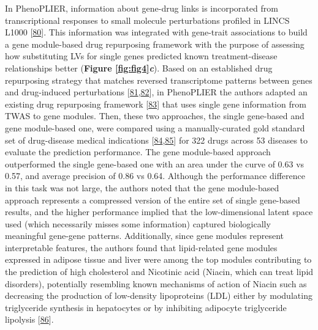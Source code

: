 In PhenoPLIER, information about gene-drug links is incorporated from transcriptional responses to small molecule perturbations profiled in LINCS L1000 {[}\protect\hyperlink{ref-F7lIlh2N}{80}{]}.
This information was integrated with gene-trait associations to build a gene module-based drug repurposing framework with the purpose of assessing how substituting LVs for single genes predicted known treatment-disease relationships better (\textbf{Figure \ref{fig:fig4}\emph{c}}).
Based on an established drug repurposing strategy that matches reversed transcriptome patterns between genes and drug-induced perturbations {[}\protect\hyperlink{ref-1ClBKizD7}{81},\protect\hyperlink{ref-mZjkE1xU}{82}{]}, in PhenoPLIER the authors adapted an existing drug repurposing framework {[}\protect\hyperlink{ref-17oeJ0CXy}{83}{]} that uses single gene information from TWAS to gene modules.
Then, these two approaches, the single gene-based and gene module-based one, were compared using a manually-curated gold standard set of drug-disease medical indications {[}\protect\hyperlink{ref-O21tn8vf}{84},\protect\hyperlink{ref-10KA5jTBQ}{85}{]} for 322 drugs across 53 diseases to evaluate the prediction performance.
The gene module-based approach outperformed the single gene-based one with an area under the curve of 0.63 vs 0.57, and average precision of 0.86 vs 0.64.
Although the performance difference in this task was not large, the authors noted that the gene module-based approach represents a compressed version of the entire set of single gene-based results, and the higher performance implied that the low-dimensional latent space used (which necessarily misses some information) captured biologically meaningful gene-gene patterns.
Additionally, since gene modules represent interpretable features, the authors found that lipid-related gene modules expressed in adipose tissue and liver were among the top modules contributing to the prediction of high cholesterol and Nicotinic acid (Niacin, which can treat lipid disorders), potentially resembling known mechanisms of action of Niacin such as decreasing the production of low-density lipoproteins (LDL) either by modulating triglyceride synthesis in hepatocytes or by inhibiting adipocyte triglyceride lipolysis {[}\protect\hyperlink{ref-LVihFr3g}{86}{]}.

